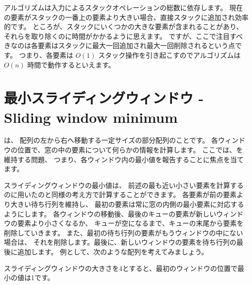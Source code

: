 アルゴリズムは入力によるスタックオペレーションの総数に依存します。
現在の要素がスタックの一番上の要素より大きい場合、直接スタックに追加され効率的です。
ところが、スタックにいくつかの大きな要素が含まれることがあり、それらを取り除くのに時間がかかるように思えます。
ですが、ここで注目すべきなのは各要素はスタックに最大一回追加され最大一回削除されるという点です。
つまり、各要素は $O(1)$ スタック操作を引き起こすのでアルゴリズムは $O(n)$ 時間で動作するといえます。

\section{最小スライディングウィンドウ - Sliding window minimum}


は、
配列の左から右へ移動する一定サイズの部分配列のことです。
各ウィンドウの位置で、窓の中の要素について何らかの情報を計算します。
ここでは、を維持する問題、
つまり、各ウィンドウ内の最小値を報告することに焦点を当てます。

スライディングウィンドウの最小値は、
前述の最も近い小さい要素を計算するのに用いたのと同様の考え方で計算することができます。
各要素が前の要素より大きい待ち行列を維持し、
最初の要素は常に窓の内側の最小要素に対応するようにします。
各ウィンドウの移動後、最後のキューの要素が新しいウィンドウの要素より小さくなるか、
キューが空になるまで、キューの末尾から要素を削除していきます。
また、最初の待ち行列の要素がもうウィンドウの中にない場合は、
それを削除します。最後に、新しいウィンドウの要素を待ち行列の最後に追加します。
例として、次のような配列を考えてみましょう。

\begin{center}
\end{center}

スライディングウィンドウの大きさを4とすると、最初のウィンドウの位置で最小の値は1です。

